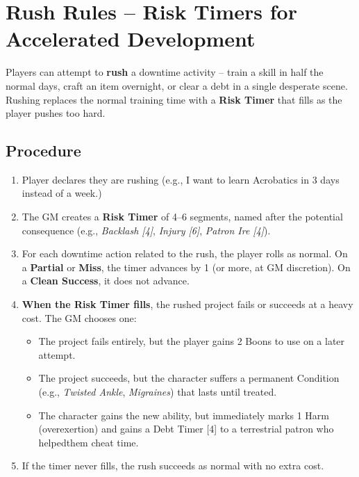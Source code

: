 \section{Rush Rules -- Risk Timers for Accelerated Development}
\label{sec:rush-rules}

Players can attempt to \textbf{rush} a downtime activity -- train a skill in half the normal days, craft an item overnight, or clear a debt in a single desperate scene. Rushing replaces the normal training time with a \textbf{Risk Timer } that fills as the player pushes too hard.

\subsection{Procedure}
\label{subsec:rush-procedure}
\begin{enumerate}
\item Player declares they are rushing (e.g., \textquotedbl I want to learn Acrobatics in 3 days instead of a week.\textquotedbl)
\item The GM creates a \textbf{Risk Timer } of 4--6 segments, named after the potential consequence (e.g., \textit{Backlash [4]}, \textit{Injury [6]}, \textit{Patron Ire [4]}).
\item For each downtime action related to the rush, the player rolls as normal. On a \textbf{Partial} or \textbf{Miss}, the timer advances by 1 (or more, at GM discretion). On a \textbf{Clean Success}, it does not advance.
\item \textbf{When the Risk Timer fills}, the rushed project fails or succeeds at a heavy cost. The GM chooses one:
  \begin{itemize}
    \item The project fails entirely, but the player gains 2 Boons to use on a later attempt.
    \item The project succeeds, but the character suffers a permanent Condition (e.g., \textit{Twisted Ankle}, \textit{Migraines}) that lasts until treated.
    \item The character gains the new ability, but immediately marks 1 Harm (overexertion) and gains a Debt Timer [4] to a terrestrial patron who \textquotedbl helped\textquotedbl them cheat time.
  \end{itemize}
\item If the timer never fills, the rush succeeds as normal with no extra cost.
\end{enumerate}

